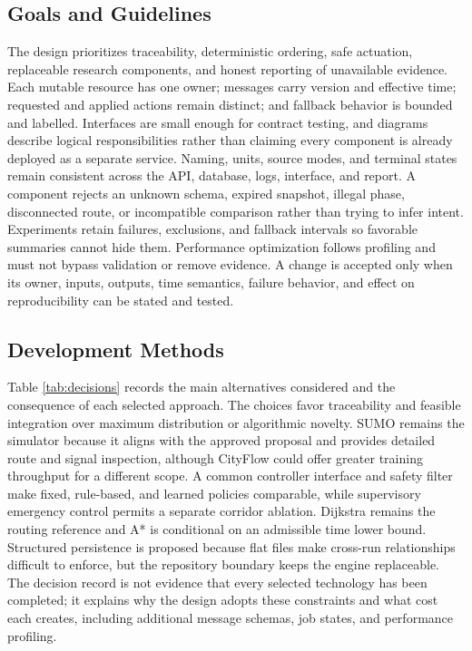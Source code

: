 \subsection{Goals and Guidelines}

The design prioritizes traceability, deterministic ordering, safe actuation, replaceable research components, and honest reporting of unavailable evidence. Each mutable resource has one owner; messages carry version and effective time; requested and applied actions remain distinct; and fallback behavior is bounded and labelled. Interfaces are small enough for contract testing, and diagrams describe logical responsibilities rather than claiming every component is already deployed as a separate service. Naming, units, source modes, and terminal states remain consistent across the API, database, logs, interface, and report. A component rejects an unknown schema, expired snapshot, illegal phase, disconnected route, or incompatible comparison rather than trying to infer intent. Experiments retain failures, exclusions, and fallback intervals so favorable summaries cannot hide them. Performance optimization follows profiling and must not bypass validation or remove evidence. A change is accepted only when its owner, inputs, outputs, time semantics, failure behavior, and effect on reproducibility can be stated and tested.

\subsection{Development Methods}

Table \ref{tab:decisions} records the main alternatives considered and the consequence of each selected approach. The choices favor traceability and feasible integration over maximum distribution or algorithmic novelty. SUMO remains the simulator because it aligns with the approved proposal and provides detailed route and signal inspection, although CityFlow could offer greater training throughput for a different scope. A common controller interface and safety filter make fixed, rule-based, and learned policies comparable, while supervisory emergency control permits a separate corridor ablation. Dijkstra remains the routing reference and A* is conditional on an admissible time lower bound. Structured persistence is proposed because flat files make cross-run relationships difficult to enforce, but the repository boundary keeps the engine replaceable. The decision record is not evidence that every selected technology has been completed; it explains why the design adopts these constraints and what cost each creates, including additional message schemas, job states, and performance profiling.

